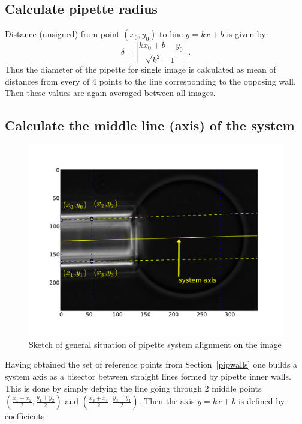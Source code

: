 \subsection{Calculate pipette radius}\label{calcpiprad}

Distance (unsigned) from point $\left(x_0,y_0\right)$ to line $y=kx+b$ is given by:
\begin{equation}
	\delta = \left|\frac{kx_0+b-y_0}{\sqrt{k^2-1}}\right|\;.
	\label{eq:pointtoline}
\end{equation}
Thus the diameter of the pipette for single image is calculated as mean of distances from every of 4 points to the line corresponding to the opposing wall. Then these values are again averaged between all images.

\subsection{Calculate the middle line (axis) of the system}\label{calcaxis}

\begin{figure}
	\includegraphics[width=\columnwidth]{figs/pipetteaxis.pdf}
 	\caption{Sketch of general situation of pipette system alignment on the image}
 	\label{fig:pipetteaxis}
\end{figure}

Having obtained the set of reference points from Section~\ref{pipwalls} one builds a system axis as a bisector between straight lines formed by pipette inner walls. This is done by simply defying the line going through 2 middle points $\left(\frac{x_1+x_2}{2}, \frac{y_1+y_2}{2}\right)$ and $\left(\frac{x_3+x_4}{2}, \frac{y_3+y_4}{2}\right)$. Then the axis $y = kx+b$ is defined by coefficients

